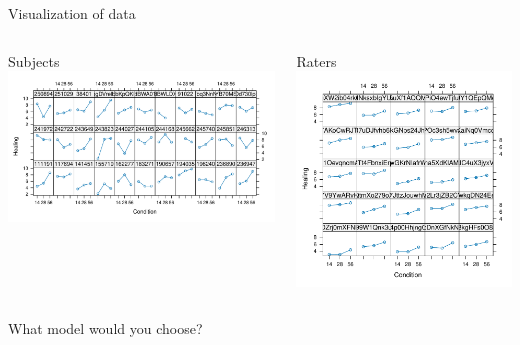 \documentclass[aspectratio=169]{beamer}
\begin{document}
\begin{frame}{Visualization of data}
  \begin{columns}
    \begin{column}[t]{.6\textwidth}
      Subjects\\
  \includegraphics[scale=.45]{../figures/heal_subjects}
    \end{column}

    \begin{column}[t]{.45\textwidth}
      Raters\\
  \includegraphics[scale=.45]{../figures/heal_raters}
    \end{column}
  \end{columns}
  \pause
  What model would you choose?
\end{frame}
\end{document}
